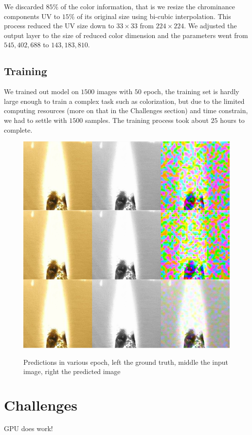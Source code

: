 \documentclass[12pt]{article}
\begin{document}
We discarded $85\%$ of the color information, that is we resize the chrominance components UV to $15\%$ of its original size using bi-cubic interpolation. This process reduced the UV size down to $33\times33$ from $224\times224$. We adjusted the output layer to the size of reduced color dimension and the parameters went from $545,402,688$ to $143,183,810$. 


\subsection{Training}
We trained out model on $1500$ images with $50$ epoch, the training set is hardly large enough to train a complex task such as colorization, but due to the limited computing resources (more on that in the Challenges section) and time constrain, we had to settle with $1500$ samples. The training process took about $25$ hours to complete. 



\begin{figure}[H]
 \centering
  \includegraphics[width=5.0in]{resource/trainstage.png}
 \label{yuvimage}
 \caption{Predictions in various epoch, left the ground truth, middle the input image, right the predicted image}
\end{figure}


\section{Challenges}
GPU does work!
\end{document}
